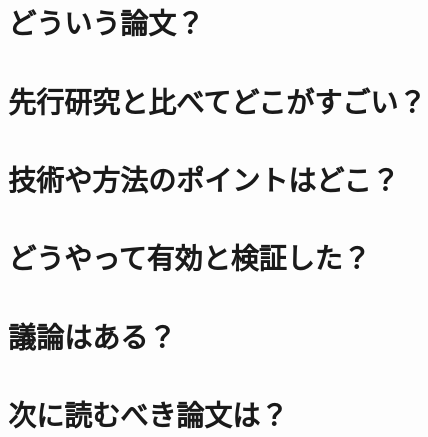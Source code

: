 \documentclass[a4paper,10pt]{ltjsarticle}
\title{}
\author{}
\date{2022/05/03}
\newcommand{\1}{\mbox{1}\hspace{-0.25em}\mbox{l}}
\theoremstyle{definition}
\begin{document}
    \maketitle
    \abstract{}


    \section{どういう論文？}


    \section{先行研究と比べてどこがすごい？}


    \section{技術や方法のポイントはどこ？}


    \section{どうやって有効と検証した？}


    \section{議論はある？}


    \section{次に読むべき論文は？}
\end{document}
